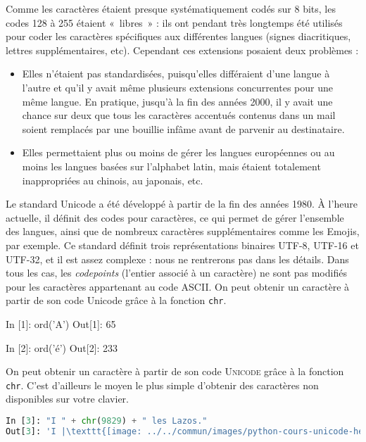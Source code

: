 \documentclass{magnolia}
\begin{document}
Comme les caractères étaient presque systématiquement codés sur 8 bits,
les codes 128 à 255 étaient «~libres~» : ils ont pendant très longtemps
été utilisés pour coder les caractères spécifiques aux différentes
langues (signes diacritiques, lettres supplémentaires, etc). Cependant
ces extensions posaient deux problèmes :
\begin{itemize}
  \item Elles n'étaient pas standardisées, puisqu'elles différaient d'une
        langue à l'autre et qu'il y avait même plusieurs extensions
        concurrentes pour une même langue. En pratique, jusqu'à la
        fin des années 2000, il y avait une chance sur deux que tous les
        caractères accentués contenus dans un mail soient remplacés par
        une bouillie infâme avant de parvenir au destinataire.
  \item Elles permettaient plus ou moins de gérer les langues européennes
        ou au moins les langues basées sur l'alphabet latin, mais étaient
        totalement inappropriées au chinois, au japonais, etc.
\end{itemize}
\vspace{2ex}

Le standard Unicode a été développé à partir de la fin des années 1980. À l'heure
actuelle, il définit des codes pour  caractères, ce qui
permet de gérer l'ensemble des langues, ainsi que de nombreux caractères
supplémentaires comme les Emojis, par exemple. Ce standard définit
trois représentations binaires UTF-8, UTF-16 et UTF-32, et il est assez
complexe : nous ne rentrerons pas dans les détails. Dans tous les cas,
les \emph{codepoints} (l'entier associé à un caractère) ne sont pas
modifiés pour les caractères appartenant au code ASCII.
On peut obtenir un caractère à partir de son code Unicode grâce à la fonction
\verb!chr!.

\begin{pythoncode}
In [1]: ord('A')
Out[1]: 65

In [2]: ord('é')
Out[2]: 233
\end{pythoncode}
  
  \noindent
  On peut obtenir un caractère à partir de son code \textsc{Unicode} grâce à la fonction
  \verb!chr!.
  C'est d'ailleurs le moyen le plus simple d'obtenir des caractères non
  disponibles sur votre clavier.
  
\begin{lstlisting}[language=python, escapeinside=||]
In [3]: "I " + chr(9829) + " les Lazos."
Out[3]: 'I |\texttt{[image: ../../commun/images/python-cours-unicode-heart.png]}| les Lazos.'
\end{lstlisting}
\end{document}
